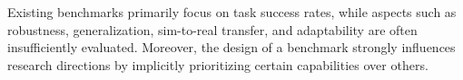 Existing benchmarks primarily focus on task success rates, while aspects such as robustness, generalization, sim-to-real transfer, and adaptability are often insufficiently evaluated. Moreover, the design of a benchmark strongly influences research directions by implicitly prioritizing certain capabilities over others.




